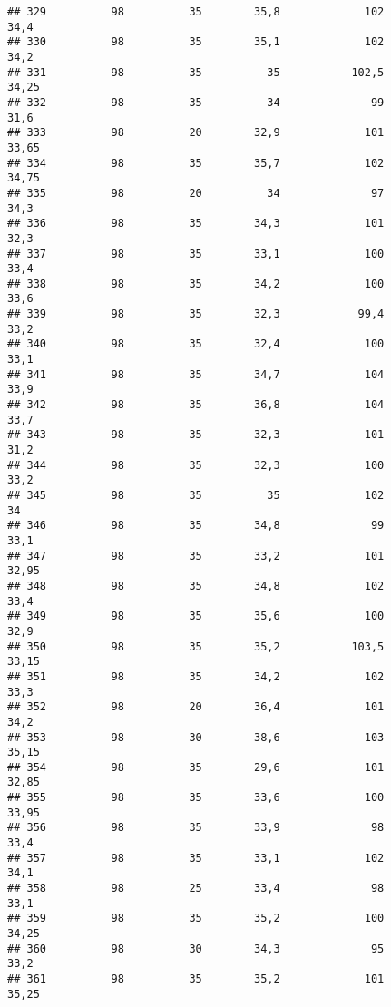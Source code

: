 \documentclass[
]{article}
\begin{document}
\begin{verbatim}
## 329          98          35        35,8             102                 34,4
## 330          98          35        35,1             102                 34,2
## 331          98          35          35           102,5                34,25
## 332          98          35          34              99                 31,6
## 333          98          20        32,9             101                33,65
## 334          98          35        35,7             102                34,75
## 335          98          20          34              97                 34,3
## 336          98          35        34,3             101                 32,3
## 337          98          35        33,1             100                 33,4
## 338          98          35        34,2             100                 33,6
## 339          98          35        32,3            99,4                 33,2
## 340          98          35        32,4             100                 33,1
## 341          98          35        34,7             104                 33,9
## 342          98          35        36,8             104                 33,7
## 343          98          35        32,3             101                 31,2
## 344          98          35        32,3             100                 33,2
## 345          98          35          35             102                   34
## 346          98          35        34,8              99                 33,1
## 347          98          35        33,2             101                32,95
## 348          98          35        34,8             102                 33,4
## 349          98          35        35,6             100                 32,9
## 350          98          35        35,2           103,5                33,15
## 351          98          35        34,2             102                 33,3
## 352          98          20        36,4             101                 34,2
## 353          98          30        38,6             103                35,15
## 354          98          35        29,6             101                32,85
## 355          98          35        33,6             100                33,95
## 356          98          35        33,9              98                 33,4
## 357          98          35        33,1             102                 34,1
## 358          98          25        33,4              98                 33,1
## 359          98          35        35,2             100                34,25
## 360          98          30        34,3              95                 33,2
## 361          98          35        35,2             101                35,25

\end{verbatim}
\end{document}
